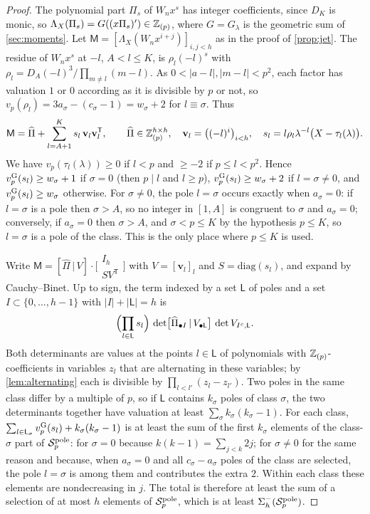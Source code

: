 \begin{proof}
The polynomial part $\Pi_s$ of $W_nx^s$ has integer coefficients, since $D_K$ is monic, so $\Lambda_X(\Pi_s)=G((x\Pi_s)')\in\mathbb{Z}_{(p)}$, where $G=G_\lambda$ is the geometric sum of \cref{sec:moments}. Let $\mathsf M=[\Lambda_X(W_nx^{i+j})]_{i,j<h}$ as in the proof of \cref{prop:jet}. The residue of $W_nx^s$ at $-l$, $A<l\le K$, is $\rho_l(-l)^s$ with $\rho_l=D_A(-l)^3/\prod_{m\ne l}(m-l)$. As $0<|a-l|,|m-l|<p^2$, each factor has valuation $1$ or $0$ according as it is divisible by $p$ or not, so $v_p(\rho_l)=3a_\sigma-(c_\sigma-1)=w_\sigma+2$ for $l\equiv\sigma$. Thus
\[
\mathsf M=\widehat\Pi+\sum_{l=A+1}^Ks_l\,\mathbf v_l\mathbf v_l^{\mathsf T},\qquad \widehat\Pi\in\mathbb{Z}_{(p)}^{h\times h},\quad \mathbf v_l=\bigl((-l)^i\bigr)_{i<h},\quad s_l=l\rho_l\lambda^{-l}\bigl(X-\tau_l(\lambda)\bigr).
\]
We have $v_p(\tau_l(\lambda))\ge0$ if $l<p$ and $\ge-2$ if $p\le l<p^2$. Hence $v^{\mathrm{G}}_{p}(s_l)\ge w_\sigma+1$ if $\sigma=0$ (then $p\mid l$ and $l\ge p$), $v^{\mathrm{G}}_{p}(s_l)\ge w_\sigma+2$ if $l=\sigma\ne0$, and $v^{\mathrm{G}}_{p}(s_l)\ge w_\sigma$ otherwise. For $\sigma\ne0$, the pole $l=\sigma$ occurs exactly when $a_\sigma=0$: if $l=\sigma$ is a pole then $\sigma>A$, so no integer in $[1,A]$ is congruent to $\sigma$ and $a_\sigma=0$; conversely, if $a_\sigma=0$ then $\sigma>A$, and $\sigma<p\le K$ by the hypothesis $p\le K$, so $l=\sigma$ is a pole of the class. This is the only place where $p\le K$ is used.

Write $\mathsf M=[\widehat\Pi\,|\,V]\cdot\bigl[\begin{smallmatrix}I_h\\ SV^{\mathsf T}\end{smallmatrix}\bigr]$ with $V=[\mathbf v_l]_l$ and $S=\mathrm{diag}(s_l)$, and expand by Cauchy--Binet. Up to sign, the term indexed by a set $\mathsf L$ of poles and a set $I\subset\{0,\dots,h-1\}$ with $|I|+|\mathsf L|=h$ is
\[
\Bigl(\prod_{l\in\mathsf L}s_l\Bigr)\,\det\bigl[\widehat\Pi_{\bullet I}\,|\,V_{\bullet\mathsf L}\bigr]\,\det V_{I^c,\mathsf L}.
\]
Both determinants are values at the points $l\in\mathsf L$ of polynomials with $\mathbb{Z}_{(p)}$-coefficients in variables $z_l$ that are alternating in these variables; by \cref{lem:alternating} each is divisible by $\prod_{l<l'}(z_l-z_{l'})$. Two poles in the same class differ by a multiple of $p$, so if $\mathsf L$ contains $k_\sigma$ poles of class $\sigma$, the two determinants together have valuation at least $\sum_\sigma k_\sigma(k_\sigma-1)$. For each class, $\sum_{l\in\mathsf L_\sigma}v^{\mathrm{G}}_{p}(s_l)+k_\sigma(k_\sigma-1)$ is at least the sum of the first $k_\sigma$ elements of the class-$\sigma$ part of $\mathcal{S}^{\mathrm{pole}}_p$: for $\sigma=0$ because $k(k-1)=\sum_{j<k}2j$; for $\sigma\ne0$ for the same reason and because, when $a_\sigma=0$ and all $c_\sigma-a_\sigma$ poles of the class are selected, the pole $l=\sigma$ is among them and contributes the extra $2$. Within each class these elements are nondecreasing in $j$. The total is therefore at least the sum of a selection of at most $h$ elements of $\mathcal{S}^{\mathrm{pole}}_p$, which is at least $\Sigma^-_h(\mathcal{S}^{\mathrm{pole}}_p)$.
\end{proof}

